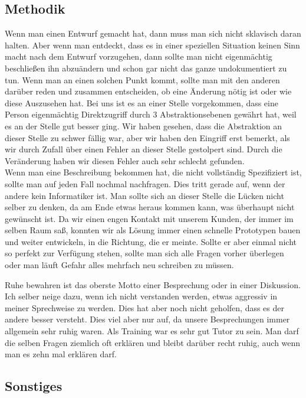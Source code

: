 \subsection{Methodik}

Wenn man einen Entwurf gemacht hat, dann muss man sich nicht sklavisch daran halten. Aber wenn man entdeckt, dass es in einer speziellen Situation keinen Sinn macht nach dem Entwurf vorzugehen, dann sollte man nicht eigenmächtig beschließen ihn abzuändern und schon gar nicht das ganze undokumentiert zu tun. Wenn man an einen solchen Punkt kommt, sollte man mit den anderen darüber reden und zusammen entscheiden, ob eine Änderung nötig ist oder wie diese Auszusehen hat. Bei uns ist es an einer Stelle vorgekommen, dass eine Person eigenmächtig Direktzugriff durch 3 Abstraktionsebenen gewährt hat, weil es an der Stelle gut besser ging. Wir haben gesehen, dass die Abstraktion an dieser Stelle zu schwer fällig war, aber wir haben den Eingriff erst bemerkt, als wir durch Zufall über einen Fehler an dieser Stelle gestolpert sind. Durch die Veränderung haben wir diesen Fehler auch sehr schlecht gefunden.\\

Wenn man eine Beschreibung bekommen hat, die nicht vollständig Spezifiziert ist, sollte man auf jeden Fall nochmal nachfragen. Dies tritt gerade auf, wenn der andere kein Informatiker ist. Man sollte sich an dieser Stelle die Lücken nicht selber zu denken, da am Ende etwas heraus kommen kann, was überhaupt nicht gewünscht ist. Da wir einen engen Kontakt mit unserem Kunden, der immer im selben Raum saß, konnten wir als Lösung immer einen schnelle Prototypen bauen und weiter entwickeln, in die Richtung, die er meinte. Sollte er aber einmal nicht so perfekt zur Verfügung stehen, sollte man sich alle Fragen vorher überlegen oder man läuft Gefahr alles mehrfach neu schreiben zu müssen.

Ruhe bewahren ist das oberste Motto einer Besprechung oder in einer Diskussion. Ich selber neige dazu, wenn ich nicht verstanden werden, etwas aggressiv in meiner Sprechweise zu werden. Dies hat aber noch nicht geholfen, dass es der andere besser versteht. Dies viel aber nur auf, da unsere Besprechungen immer allgemein sehr ruhig waren. Als Training war es sehr gut Tutor zu sein. Man darf die selben Fragen ziemlich oft erklären und bleibt darüber recht ruhig, auch wenn man es zehn mal erklären darf.

\subsection{Sonstiges}

